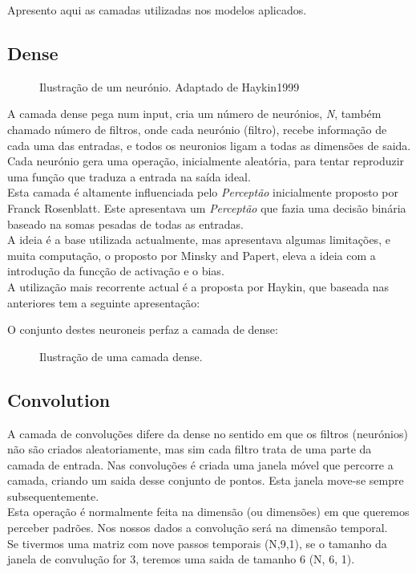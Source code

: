 Apresento aqui as camadas utilizadas nos modelos aplicados.\\

\subsection{Dense\label{se:dense_layer}}

\begin{figure}[H]
	\centering
	\resizebox{\linewidth}{!}{}
	\caption{Ilustração de um neurónio. Adaptado de Haykin1999\cite{Haykin1999}}
	\label{fig:neuronio}
\end{figure}


A camada dense pega num input, cria um número de neurónios, \textit{N}, também chamado número de filtros, onde cada neurónio (filtro), recebe informação de cada uma das entradas, e todos os neuronios ligam a todas as dimensões de saida. \\
Cada neurónio gera uma operação, inicialmente aleatória, para tentar reproduzir uma função que traduza a entrada na saída ideal. \\
Esta camada é altamente influenciada pelo \textit{Perceptão} inicialmente proposto por Franck Rosenblatt\cite{Rosenblatt1958}. Este apresentava um \textit{Perceptão} que fazia uma decisão binária baseado na somas pesadas de todas as entradas. \\
A ideia é a base utilizada actualmente, mas apresentava algumas limitações, e muita computação, o proposto por Minsky and Papert\cite{Minsky1969}, eleva a ideia com a introdução da funcção de activação e o bias. \\
A utilização mais recorrente actual é a proposta por Haykin\cite{Haykin1999}, que baseada nas anteriores tem a seguinte apresentação:


O conjunto destes neuroneis perfaz a camada de dense:

\begin{figure}[H]
	\centering
	\resizebox{\linewidth}{!}{}
	\caption{Ilustração de uma camada dense.}
	\label{fig:dense}
\end{figure}



\subsection{Convolution\label{se:conv_layer}}

A camada de convoluções difere da dense no sentido em que os filtros (neurónios) não são criados aleatoriamente, mas sim cada filtro trata de uma parte da camada de entrada.
Nas convoluções é criada uma janela móvel que percorre a camada, criando um saida desse conjunto de pontos. Esta janela move-se sempre subsequentemente.\\
Esta operação é normalmente feita na dimensão (ou dimensões) em que queremos perceber padrões. Nos nossos dados a convolução será na dimensão temporal. \\
Se tivermos uma matriz com nove passos temporais (N,9,1), se o tamanho da janela de convulução for 3, teremos uma saida de tamanho 6 (N, 6, 1).

